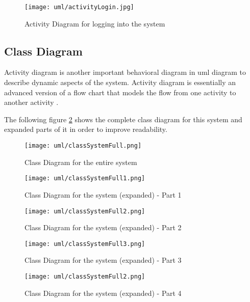 \documentclass[12pt]{report}
\begin{document}
\begin{figure}[H]
	\centering
	\texttt{[image: uml/activityLogin.jpg]}
	\caption{Activity Diagram for logging into the system}
	\label{fig:activityLogin}
\end{figure}

\newpage
\subsection{Class Diagram}
Activity diagram is another important behavioral diagram in \acrshort{uml} diagram to describe dynamic aspects of the system. Activity diagram is essentially an advanced version of a flow chart that models the flow from one activity to another activity \cite{vparadigm_2018_uml}.

The following figure \ref{fig:classSystemFull} shows the complete class diagram for this system and expanded parts of it in order to improve readability.

\begin{figure}[H]
	\centering
	\texttt{[image: uml/classSystemFull.png]}
	\caption{Class Diagram for the entire system}
	\label{fig:classSystemFull}
\end{figure}

\begin{figure}[H]
	\centering
	\texttt{[image: uml/classSystemFull1.png]}
	\caption{Class Diagram for the system (expanded) - Part 1}
\end{figure}

\begin{figure}[H]
	\centering
	\texttt{[image: uml/classSystemFull2.png]}
	\caption{Class Diagram for the system (expanded) - Part 2}
\end{figure}

\begin{figure}[H]
	\centering
	\texttt{[image: uml/classSystemFull3.png]}
	\caption{Class Diagram for the system (expanded) - Part 3}
\end{figure}


\begin{figure}[H]
	\centering
	\texttt{[image: uml/classSystemFull2.png]}
	\caption{Class Diagram for the system (expanded) - Part 4}
\end{figure}

\end{document}
